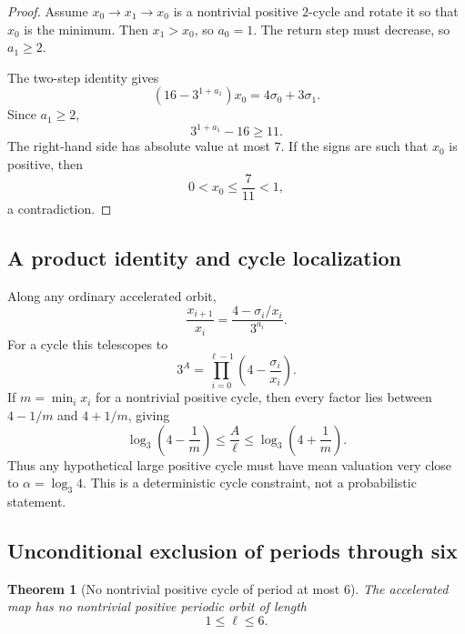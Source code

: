\documentclass[11pt]{article}
\newtheorem{theorem}{Theorem}[section]
\theoremstyle{definition}
\theoremstyle{remark}
\begin{document}
\begin{proof}
Assume $x_0\to x_1\to x_0$ is a nontrivial positive $2$-cycle and rotate it so that $x_0$ is the minimum.  Then $x_1>x_0$, so $a_0=1$.  The return step must decrease, so $a_1\ge2$.

The two-step identity gives
\[
(16-3^{1+a_1})x_0=4\sigma_0+3\sigma_1.
\]
Since $a_1\ge2$,
\[
3^{1+a_1}-16\ge11.
\]
The right-hand side has absolute value at most $7$.  If the signs are such that $x_0$ is positive, then
\[
0<x_0\le\frac7{11}<1,
\]
a contradiction.
\end{proof}

\subsection{A product identity and cycle localization}

Along any ordinary accelerated orbit,
\[
\frac{x_{i+1}}{x_i}
=
\frac{4-\sigma_i/x_i}{3^{a_i}}.
\]
For a cycle this telescopes to
\begin{equation}
3^A
=
\prod_{i=0}^{\ell-1}
\left(4-\frac{\sigma_i}{x_i}\right).
\label{eq:cycle-product}
\end{equation}
If $m=\min_i x_i$ for a nontrivial positive cycle, then every factor lies between $4-1/m$ and $4+1/m$, giving
\begin{equation}
\log_3\left(4-\frac1m\right)
\le
\frac{A}{\ell}
\le
\log_3\left(4+\frac1m\right).
\label{eq:cycle-localization}
\end{equation}
Thus any hypothetical large positive cycle must have mean valuation very close to $\alpha=\log_3 4$.  This is a deterministic cycle constraint, not a probabilistic statement.

\subsection{Unconditional exclusion of periods through six}

\begin{theorem}[No nontrivial positive cycle of period at most $6$]
The accelerated map has no nontrivial positive periodic orbit of length
\[
1\le\ell\le6.
\]
\end{theorem}
\end{document}
